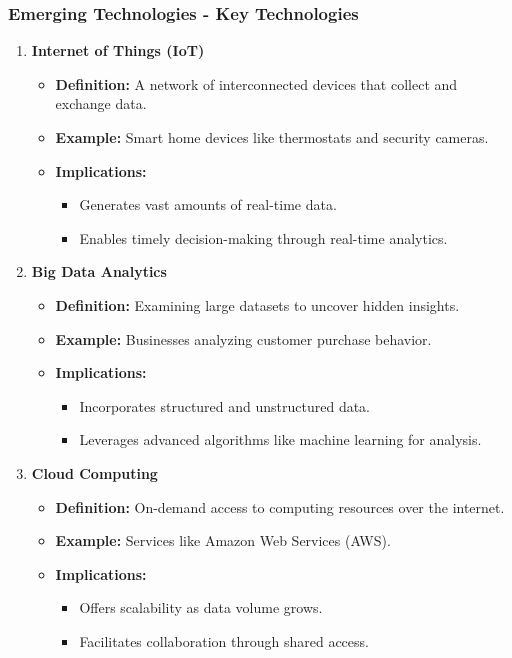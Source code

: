 \documentclass[aspectratio=169]{beamer}
\begin{document}
\begin{frame}[fragile]
    \frametitle{Emerging Technologies - Key Technologies}
    \begin{enumerate}
        \item \textbf{Internet of Things (IoT)}
            \begin{itemize}
                \item \textbf{Definition:} A network of interconnected devices that collect and exchange data.
                \item \textbf{Example:} Smart home devices like thermostats and security cameras.
                \item \textbf{Implications:}
                    \begin{itemize}
                        \item Generates vast amounts of real-time data.
                        \item Enables timely decision-making through real-time analytics.
                    \end{itemize}
            \end{itemize}
        
        \item \textbf{Big Data Analytics}
            \begin{itemize}
                \item \textbf{Definition:} Examining large datasets to uncover hidden insights.
                \item \textbf{Example:} Businesses analyzing customer purchase behavior.
                \item \textbf{Implications:}
                    \begin{itemize}
                        \item Incorporates structured and unstructured data.
                        \item Leverages advanced algorithms like machine learning for analysis.
                    \end{itemize}
            \end{itemize}

        \item \textbf{Cloud Computing}
            \begin{itemize}
                \item \textbf{Definition:} On-demand access to computing resources over the internet.
                \item \textbf{Example:} Services like Amazon Web Services (AWS).
                \item \textbf{Implications:}
                    \begin{itemize}
                        \item Offers scalability as data volume grows.
                        \item Facilitates collaboration through shared access.
                    \end{itemize}
            \end{itemize}
    \end{enumerate}
\end{frame}
\end{document}
